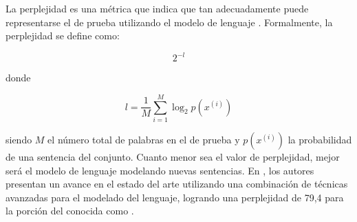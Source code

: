La perplejidad es una m\'etrica que indica que tan adecuadamente puede representarse el  de prueba utilizando el modelo de lenguaje \cite{RosenfeldStatistical1997}. 
Formalmente, la perplejidad se define como:

\begin{equation*}
    2^{-l}
\end{equation*}

donde

\begin{equation*}
    l = \frac{1}{M}\sum_{i=1}^{M}\log_2p(x^{(i)})
\end{equation*}

siendo $M$ el n\'umero total de palabras en el  de prueba y $p(x^{(i)})$ la 
probabilidad de una sentencia del conjunto. Cuanto menor sea el valor de perplejidad, mejor ser\'a 
el modelo de lenguaje modelando nuevas sentencias. 
En \cite{MikolovEmpirical2011}, los autores presentan un avance en el estado del arte
utilizando una combinaci\'on de t\'ecnicas avanzadas para el modelado del lenguaje, logrando una
perplejidad de 79,4 para la porci\'on del  conocida 
como .